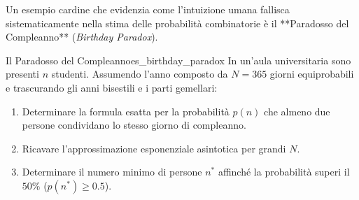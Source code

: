 Un esempio cardine che evidenzia come l'intuizione umana fallisca sistematicamente nella stima delle probabilità combinatorie è il **Paradosso del Compleanno** (\emph{Birthday Paradox}).

\begin{esercizio}{Il Paradosso del Compleanno}{es_birthday_paradox}
In un'aula universitaria sono presenti $n$ studenti. Assumendo l'anno composto da $N = 365$ giorni equiprobabili e trascurando gli anni bisestili e i parti gemellari:
\begin{enumerate}
    \item[(a)] Determinare la formula esatta per la probabilità $p(n)$ che almeno due persone condividano lo stesso giorno di compleanno.
    \item[(b)] Ricavare l'approssimazione esponenziale asintotica per grandi $N$.
    \item[(c)] Determinare il numero minimo di persone $n^*$ affinché la probabilità superi il $50\%$ ($p(n^*) \ge 0.5$).
\end{enumerate}
\end{esercizio}

